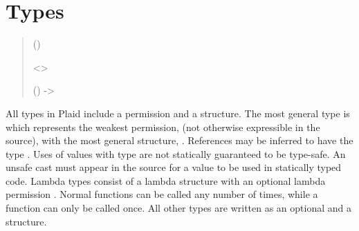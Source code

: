 \section{Types}

\begin{quote}


 {}

 {} 

 {} 

 ()


 {}

 {}

 {}


 {} <>

 {}


 {} 


 {} ()
	-> 


 {}

 {} 


{ {} }
\end{quote}

All types in Plaid include a permission and a structure.  The most general
type is  which represents the weakest
permission,  (not otherwise expressible in the source), with the most 
general structure, . References may be inferred to have the
type .  Uses of values with type  are not statically
guaranteed to be type-safe.  An unsafe cast must appear in the source
for a  value to be used in statically typed code. 
Lambda types consist of a lambda structure with an optional lambda permission 
.  Normal functions can be called any number of times,
while a  function can only be called once.
All other types are written as an optional  and a structure.

